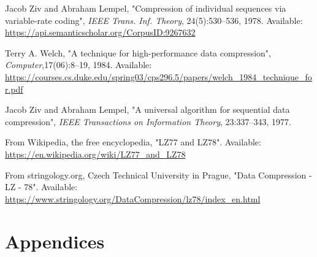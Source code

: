 \documentclass[12pt, a4paper]{article}
\begin{document}
\begin{thebibliography}{7}

Jacob Ziv and Abraham Lempel, "Compression of individual sequences via variable-rate coding", \emph{IEEE Trans. Inf. Theory}, 24(5):530–536, 1978. Available: \url{https://api.semanticscholar.org/CorpusID:9267632}

Terry A. Welch, "A technique for high-performance data compression", \emph{Computer},17(06):8–19, 1984. Available: \url{https://courses.cs.duke.edu/spring03/cps296.5/papers/welch_1984_technique_for.pdf}

Jacob Ziv and Abraham Lempel, "A universal algorithm for sequential data compression", \emph{IEEE Transactions on Information Theory}, 23:337–343, 1977. 

From Wikipedia, the free encyclopedia, "LZ77 and LZ78". Available: \url{https://en.wikipedia.org/wiki/LZ77_and_LZ78}

From stringology.org, Czech Technical University in Prague, "Data Compression - LZ - 78". Available: \url{https://www.stringology.org/DataCompression/lz78/index_en.html}

\end{thebibliography}
\newpage

\section{Appendices}

\end{document}
